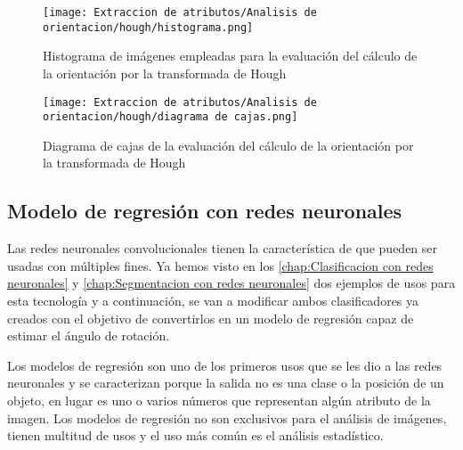 \begin{figure}[ht] %
	\centering
	\texttt{[image: Extraccion de atributos/Analisis de orientacion/hough/histograma.png]}
	\caption[Histograma de imágenes rotadas empleadas para evaluación]{Histograma de imágenes empleadas para la evaluación del cálculo de la orientación por la transformada de Hough}
	\label{fig:histograma hough}
	\vspace{-5pt}
\end{figure}

\begin{figure}[ht] %
	\centering
	\texttt{[image: Extraccion de atributos/Analisis de orientacion/hough/diagrama de cajas.png]}
	\caption[Diagrama de cajas de la orientación por la transformada de Hough]{Diagrama de cajas de la evaluación del cálculo de la orientación por la transformada de Hough}
	\label{fig:cajas hough}
	\vspace{-5pt}
\end{figure}


\clearpage
\subsection{Modelo de regresión con redes neuronales}
Las redes neuronales convolucionales tienen la característica de que pueden ser usadas con múltiples fines. Ya hemos visto en los \autoref{chap:Clasificacion con redes neuronales} y \autoref{chap:Segmentacion con redes neuronales} dos ejemplos de usos para esta tecnología y a continuación, se van a modificar ambos clasificadores ya creados con el objetivo de convertirlos en un modelo de regresión capaz de estimar el ángulo de rotación.

Los modelos de regresión son uno de los primeros usos que se les dio a las redes neuronales y se caracterizan porque la salida no es una clase o la posición de un objeto, en lugar es uno o varios números que representan algún atributo de la imagen. Los modelos de regresión no son exclusivos para el análisis de imágenes, tienen multitud de usos y el uso más común es el análisis estadístico.

